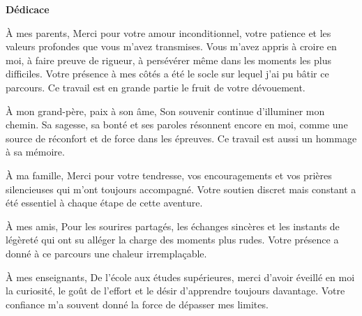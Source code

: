 \vfill{}
\begin{center}
    {
        \Large\bfseries
        Dédicace  %
    }
\end{center}

À mes parents,
Merci pour votre amour inconditionnel, votre patience et les valeurs profondes que vous m’avez transmises. Vous m’avez appris à croire en moi, à faire preuve de rigueur, à persévérer même dans les moments les plus difficiles. Votre présence à mes côtés a été le socle sur lequel j’ai pu bâtir ce parcours. Ce travail est en grande partie le fruit de votre dévouement.

À mon grand-père, paix à son âme,
Son souvenir continue d’illuminer mon chemin. Sa sagesse, sa bonté et ses paroles résonnent encore en moi, comme une source de réconfort et de force dans les épreuves. Ce travail est aussi un hommage à sa mémoire.

À ma famille,
Merci pour votre tendresse, vos encouragements et vos prières silencieuses qui m’ont toujours accompagné. Votre soutien discret mais constant a été essentiel à chaque étape de cette aventure.

À mes amis,
Pour les sourires partagés, les échanges sincères et les instants de légèreté qui ont su alléger la charge des moments plus rudes. Votre présence a donné à ce parcours une chaleur irremplaçable.

À mes enseignants,
De l’école aux études supérieures, merci d’avoir éveillé en moi la curiosité, le goût de l’effort et le désir d’apprendre toujours davantage. Votre confiance m’a souvent donné la force de dépasser mes limites.

\vfill{}
\pagebreak